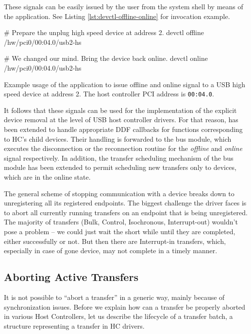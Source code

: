 These signals can be easily issued by the user from the system shell by means
of the  application. See Listing \ref{lst:devctl-offline-online}
for invocation example.

\begin{listing}
	\begin{bdsh}
		# Prepare the unplug high speed device at address 2.
		devctl offline /hw/pci0/00:04.0/usb2-hs

		# We changed our mind. Bring the device back online.
		devctl online /hw/pci0/00:04.0/usb2-hs
	\end{bdsh}
	\caption[Example usage of  to issue offline and online
	signal.]{Example usage of the  application to issue offline and
	online signal to a USB high speed device at address 2. The host controller
	PCI address is \texttt{00:04.0}.}
	\label{lst:devctl-offline-online}
\end{listing}

It follows that these signals can be used for the implementation of the
explicit device removal at the level of USB host controller drivers. For that
reason,  has been extended to handle appropriate DDF callbacks
for functions corresponding to HC's child devices. Their handling is forwarded
to the bus module, which executes the disconnection or the reconnection routine
for the \textit{offline} and \textit{online} signal respectively. In addition,
the transfer scheduling mechanism of the bus module has been extended to permit
scheduling new transfers only to devices, which are in the online state.

The general scheme of stopping communication with a device breaks down to
unregistering all its registered endpoints. The biggest challenge the driver
faces is to abort all currently running transfers on an endpoint that is being
unregistered. The majority of transfers (Bulk, Control, Isochronous,
Interrupt-out) wouldn't pose a problem -- we could just wait the short while
until they are completed, either successfully or not. But then there are
Interrupt-in transfers, which, especially in case of gone device, may not
complete in a timely manner.

\subsection{Aborting Active Transfers}

It is not possible to ``abort a transfer'' in a generic way, mainly because of
synchronization issues. Before we explain how can a transfer be properly
aborted in various Host Controllers, let us describe the lifecycle of
a transfer batch, a structure representing a transfer in HC drivers.

